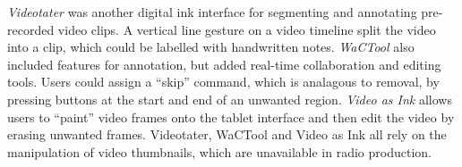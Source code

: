 

\textit{Videotater} \citep{Diakopoulos2006} was another digital ink interface for segmenting and annotating
pre-recorded video clips. A vertical line gesture on a video timeline split the video into a clip, which could be
labelled with handwritten notes.  \textit{WaCTool} \citep{Cattelan2008} also included features for annotation, but
added real-time collaboration and editing tools.  Users could assign a ``skip'' command, which is analagous to removal,
by pressing buttons at the start and end of an unwanted region.  \textit{Video as Ink} \citep{Cabral2016} allows users
to ``paint'' video frames onto the tablet interface and then edit the video by erasing unwanted frames.  Videotater,
WaCTool and Video as Ink all rely on the manipulation of video thumbnails, which are unavailable in radio production.

